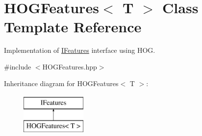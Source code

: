 \hypertarget{classHOGFeatures}{\section{\-H\-O\-G\-Features$<$ \-T $>$ \-Class \-Template \-Reference}
\label{classHOGFeatures}
}


\-Implementation of \hyperlink{classIFeatures}{\-I\-Features} interface using \-H\-O\-G.  




{\ttfamily \#include $<$\-H\-O\-G\-Features.\-hpp$>$}

\-Inheritance diagram for \-H\-O\-G\-Features$<$ \-T $>$\-:\begin{figure}[H]
\begin{center}
\leavevmode
\includegraphics[height=2.000000cm]{classHOGFeatures}
\end{center}
\end{figure}

